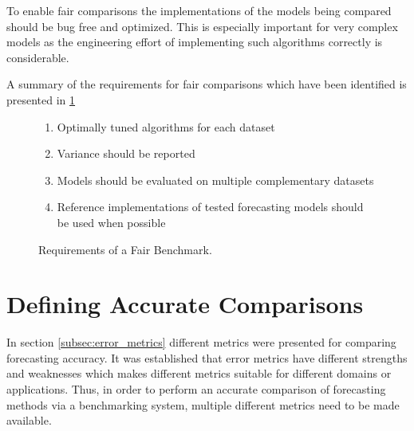 To enable fair comparisons the implementations of the models being compared should be bug free and optimized. This is especially important for very complex models as the engineering effort of implementing such algorithms correctly is considerable.

A summary of the requirements for fair comparisons which have been identified is presented in \ref{fig:fair_requirements}
\begin{figure}[h]
  \begin{enumerate}
    \item Optimally tuned algorithms for each dataset
    \item Variance should be reported
    \item Models should be evaluated on multiple complementary datasets
    \item Reference implementations of tested forecasting models should be used when possible
  \end{enumerate}
  \caption{Requirements of a Fair Benchmark.}
  \label{fig:fair_requirements}
\end{figure}

\section{Defining Accurate Comparisons}
In section \ref{subsec:error_metrics} different metrics were presented for comparing forecasting accuracy. It was established that error metrics have different strengths and weaknesses which makes different metrics suitable for different domains or applications.
Thus, in order to perform an accurate comparison of forecasting methods via a benchmarking system, multiple different metrics need to be made available.

